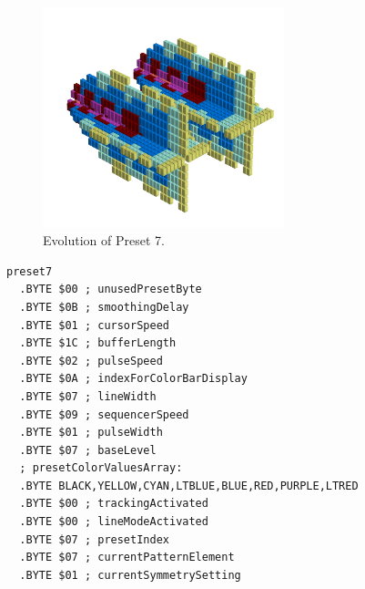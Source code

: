 \clearpage
\begin{minipage}[b]{0.48\linewidth}


                                                                 
\begin{figure}[H]                                                          
  \centering                                                             
  \begin{adjustbox}{width=7cm,center}                                   
  \includegraphics[width=7cm]{src/presets/pattern7-45.png}%
  \end{adjustbox}                                                        
\caption{Evolution of Preset 7.}                                           
\end{figure}                                                               
                                                                 
                                                                           
\end{minipage}
\hspace{0.1cm}
\begin{minipage}[b]{0.48\linewidth}                                       
\begin{lstlisting}[basicstyle=\ttfamily\scriptsize,caption=Data structure for Preset 7.]
preset7
  .BYTE $00 ; unusedPresetByte
  .BYTE $0B ; smoothingDelay
  .BYTE $01 ; cursorSpeed
  .BYTE $1C ; bufferLength
  .BYTE $02 ; pulseSpeed
  .BYTE $0A ; indexForColorBarDisplay
  .BYTE $07 ; lineWidth
  .BYTE $09 ; sequencerSpeed
  .BYTE $01 ; pulseWidth
  .BYTE $07 ; baseLevel
  ; presetColorValuesArray: 
  .BYTE BLACK,YELLOW,CYAN,LTBLUE,BLUE,RED,PURPLE,LTRED
  .BYTE $00 ; trackingActivated
  .BYTE $00 ; lineModeActivated
  .BYTE $07 ; presetIndex
  .BYTE $07 ; currentPatternElement
  .BYTE $01 ; currentSymmetrySetting
\end{lstlisting}
\end{minipage}

